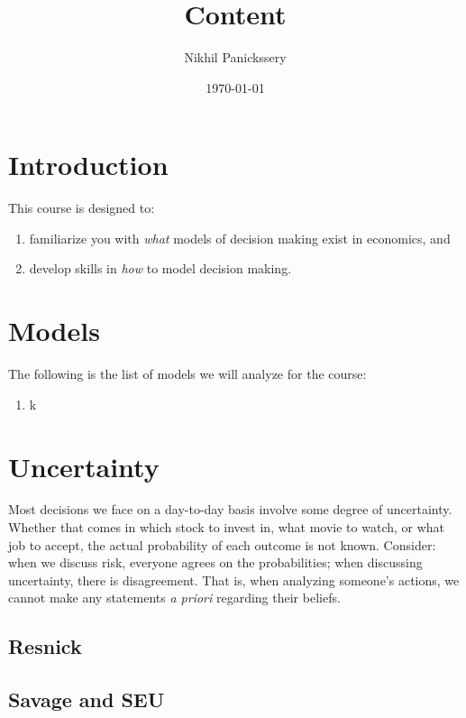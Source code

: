\documentclass[letterpaper, 12pt]{article}
\title{Content}
\author{Nikhil Panickssery}
\date{\today}
\begin{document}
\maketitle

\section{Introduction}
\label{sec:introduction}

This course is designed to:

\begin{enumerate}
\item familiarize you with \emph{what} models of decision making exist in
  economics, and
\item develop skills in \emph{how} to model decision making.
\end{enumerate}

\section{Models}
\label{sec:models}

The following is the list of models we will analyze for the course:

\begin{enumerate}
\item k
\end{enumerate}

\section{Uncertainty}
\label{sec:uncertainty}

Most decisions we face on a day-to-day basis involve some degree of
uncertainty. Whether that comes in which stock to invest in, what movie to
watch, or what job to accept, the actual probability of each outcome is not
known. Consider: when we discuss risk, everyone agrees on the probabilities;
when discussing uncertainty, there is disagreement. That is, when analyzing
someone's actions, we cannot make any statements \emph{a priori} regarding their
beliefs.

\subsection{Resnick}
\label{subsec:resnick}

\subsection{Savage and SEU}
\label{subsec:savage}
\end{document}
